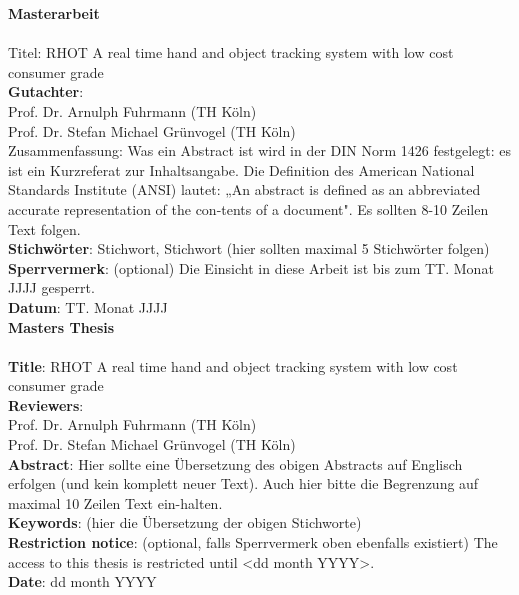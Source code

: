 \begin{titlepage}
\begin{figure}[!ht]
\begin{flushright}
\end{flushright}
\end{figure}
\newpage
\setcounter{page}{1}
\huge\textbf{Masterarbeit}\\\\
\large
Titel: RHOT A real time hand and object tracking system with low cost consumer grade\\
\textbf{Gutachter}:\\
	Prof. Dr. Arnulph Fuhrmann (TH Köln)\\
	Prof. Dr. Stefan Michael Grünvogel (TH Köln)\\
Zusammenfassung: Was ein Abstract ist wird in der DIN Norm 1426 festgelegt: es ist ein Kurzreferat zur Inhaltsangabe. Die Definition des American National Standards Institute (ANSI) lautet: „An abstract is defined as an abbreviated accurate representation of the con-tents of a document". Es sollten 8-10 Zeilen Text folgen.\\
\textbf{Stichwörter}: Stichwort, Stichwort (hier sollten maximal 5 Stichwörter folgen)\\
\textbf{Sperrvermerk}: (optional) Die Einsicht in diese Arbeit ist bis zum TT. Monat JJJJ gesperrt.\\
\textbf{Datum}: TT. Monat JJJJ\\
\newpage
\huge \textbf{Masters Thesis}\\\\
\large
\textbf{Title}: RHOT A real time hand and object tracking system with low cost consumer grade\\
\textbf{Reviewers}:\\
	Prof. Dr. Arnulph Fuhrmann (TH Köln)\\
	Prof. Dr. Stefan Michael Grünvogel (TH Köln)\\
\textbf{Abstract}: Hier sollte eine Übersetzung des obigen Abstracts auf Englisch erfolgen (und kein komplett neuer Text). Auch hier bitte die Begrenzung auf maximal 10 Zeilen Text ein-halten.\\
\textbf{Keywords}: (hier die Übersetzung der obigen Stichworte)\\
\textbf{Restriction notice}: (optional, falls Sperrvermerk oben ebenfalls existiert) The access to this thesis is restricted until <dd month YYYY>.\\
\textbf{Date}: dd month YYYY\\

\end{titlepage}
